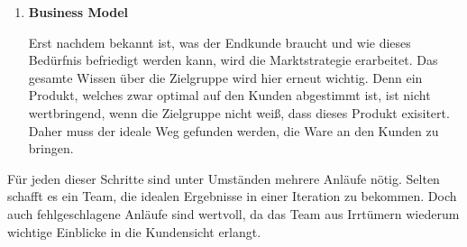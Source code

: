 \begin{enumerate}
	\item \textbf{Business Model}
	
	Erst nachdem bekannt ist, was der Endkunde braucht und wie dieses Bedürfnis befriedigt werden kann, wird die Marktstrategie erarbeitet. Das gesamte Wissen über die Zielgruppe wird hier erneut wichtig. Denn ein Produkt, welches zwar optimal auf den Kunden abgestimmt ist, ist nicht wertbringend, wenn die Zielgruppe nicht weiß, dass dieses Produkt exisitert. Daher muss der ideale Weg gefunden werden, die Ware an den Kunden zu bringen. 
\end{enumerate}

Für jeden dieser Schritte sind unter Umständen mehrere Anläufe nötig. Selten schafft es ein Team, die idealen Ergebnisse in einer Iteration zu bekommen. Doch auch fehlgeschlagene Anläufe sind wertvoll, da das Team aus Irrtümern wiederum wichtige Einblicke in die Kundensicht erlangt. 
\cite{TheInnovatorsMethod}
\newpage 